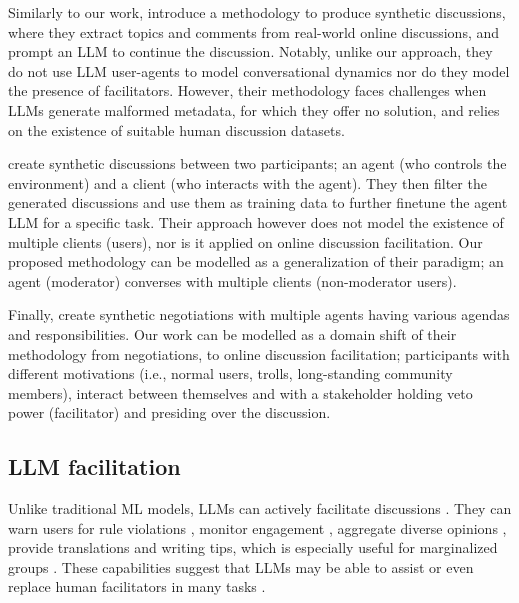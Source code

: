 Similarly to our work, \citet{balog_2024} introduce a methodology to produce synthetic discussions, where they extract topics and comments from real-world online discussions, and prompt an \ac{LLM} to continue the discussion. Notably, unlike our approach, they do not use \ac{LLM} user-agents to model conversational dynamics nor do they model the presence of facilitators. However, their methodology faces challenges when \acp{LLM} generate malformed metadata, for which they offer no solution, and relies on the existence of suitable human discussion datasets.

\citet{ulmer2024} create synthetic discussions between two participants; an agent (who controls the environment) and a client (who interacts with the agent). They then filter the generated discussions and use them as training data to further finetune the agent \ac{LLM} for a specific task. Their approach however does not model the existence of multiple clients (users), nor is it applied on online discussion facilitation. Our proposed methodology can be modelled as a generalization of their paradigm; an agent (moderator) converses with multiple clients (non-moderator users).

Finally, \citet{abdelnabi_negotiations} create synthetic negotiations with multiple agents having various agendas and responsibilities. Our work can be modelled as a domain shift of their methodology from negotiations, to online discussion facilitation; participants with different motivations (i.e., normal users, trolls, long-standing community members), interact between themselves and with a stakeholder holding veto power (facilitator) and presiding over the discussion.


\subsection{LLM facilitation}

Unlike traditional \ac{ML} models, \acp{LLM} can actively facilitate discussions \cite{korre2025evaluation}. They can warn users for rule violations \cite{Kumar_AbuHashem_Durumeric_2024}, monitor engagement \cite{schroeder-etal-2024-fora}, aggregate diverse opinions \cite{small-polis-llm}, provide translations and writing tips, which is especially useful for marginalized groups \cite{Tsai2024Generative}. These capabilities suggest that \acp{LLM} may be able to assist or even replace human facilitators in many tasks \cite{seering_self_moderation}.

